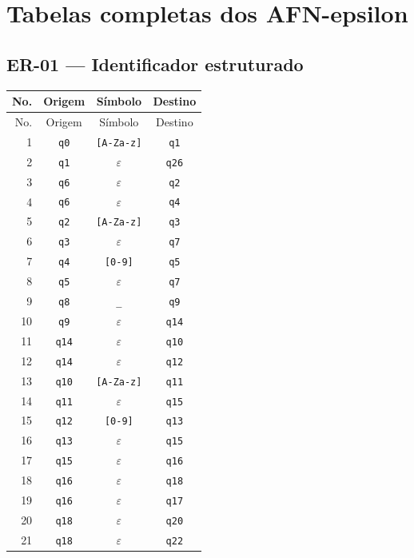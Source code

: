 \appendix
\chapter{Tabelas completas dos AFN-epsilon}
\section{ER-01 --- Identificador estruturado}
\small
\begin{longtable}{|r|c|c|c|}
\toprule
No. & Origem & Símbolo & Destino \\
\midrule
\endfirsthead
\toprule
No. & Origem & Símbolo & Destino \\
\midrule
\endhead
1 & \texttt{q0} & \texttt{[A-Za-z]} & \texttt{q1} \\
2 & \texttt{q1} & $\varepsilon$ & \texttt{q26} \\
3 & \texttt{q6} & $\varepsilon$ & \texttt{q2} \\
4 & \texttt{q6} & $\varepsilon$ & \texttt{q4} \\
5 & \texttt{q2} & \texttt{[A-Za-z]} & \texttt{q3} \\
6 & \texttt{q3} & $\varepsilon$ & \texttt{q7} \\
7 & \texttt{q4} & \texttt{[0-9]} & \texttt{q5} \\
8 & \texttt{q5} & $\varepsilon$ & \texttt{q7} \\
9 & \texttt{q8} & \texttt{\_} & \texttt{q9} \\
10 & \texttt{q9} & $\varepsilon$ & \texttt{q14} \\
11 & \texttt{q14} & $\varepsilon$ & \texttt{q10} \\
12 & \texttt{q14} & $\varepsilon$ & \texttt{q12} \\
13 & \texttt{q10} & \texttt{[A-Za-z]} & \texttt{q11} \\
14 & \texttt{q11} & $\varepsilon$ & \texttt{q15} \\
15 & \texttt{q12} & \texttt{[0-9]} & \texttt{q13} \\
16 & \texttt{q13} & $\varepsilon$ & \texttt{q15} \\
17 & \texttt{q15} & $\varepsilon$ & \texttt{q16} \\
18 & \texttt{q16} & $\varepsilon$ & \texttt{q18} \\
19 & \texttt{q16} & $\varepsilon$ & \texttt{q17} \\
20 & \texttt{q18} & $\varepsilon$ & \texttt{q20} \\
21 & \texttt{q18} & $\varepsilon$ & \texttt{q22} \\

\end{longtable}
